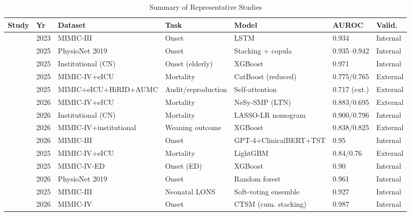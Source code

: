 \documentclass[conference]{IEEEtran}
\begin{document}
\begin{table}[t]
\caption{Summary of Representative Studies}
\label{tab:studies}
\centering
\footnotesize
\begin{tabular}{@{}lllllll@{}}
\toprule
\textbf{Study} & \textbf{Yr} & \textbf{Dataset} & \textbf{Task} & \textbf{Model} & \textbf{AUROC} & \textbf{Valid.} \\
\midrule
\cite{r13} & 2023 & MIMIC-III & Onset & LSTM & 0.934 & Internal \\
\cite{r14} & 2025 & PhysioNet 2019 & Onset & Stacking + copula & 0.935--0.942 & Internal \\
\cite{r15} & 2025 & Institutional (CN) & Onset (elderly) & XGBoost & 0.971 & Internal \\
\cite{r17} & 2025 & MIMIC-IV+eICU & Mortality & CatBoost (reduced) & 0.775/0.765 & External \\
\cite{r18} & 2025 & MIMIC+eICU+HiRID+AUMC & Audit/reproduction & Self-attention & 0.717 (ext.) & External \\
\cite{r19} & 2026 & MIMIC-IV+eICU & Mortality & NeSy-SMP (LTN) & 0.883/0.695 & External \\
\cite{r20} & 2026 & Institutional (CN) & Mortality & LASSO-LR nomogram & 0.900/0.796 & Internal \\
\cite{r21} & 2026 & MIMIC-IV+institutional & Weaning outcome & XGBoost & 0.838/0.825 & External \\
\cite{r22} & 2026 & MIMIC-III & Onset & GPT-4+ClinicalBERT+TST & 0.95 & Internal \\
\cite{r23} & 2025 & MIMIC-IV+eICU & Mortality & LightGBM & 0.84/0.76 & External \\
\cite{r27} & 2025 & MIMIC-IV-ED & Onset (ED) & XGBoost & 0.90 & Internal \\
\cite{r30} & 2026 & PhysioNet 2019 & Onset & Random forest & 0.961 & Internal \\
\cite{r32} & 2025 & MIMIC-III & Neonatal LONS & Soft-voting ensemble & 0.927 & Internal \\
\cite{r33} & 2026 & MIMIC-IV & Onset & CTSM (cum. stacking) & 0.987 & Internal \\
\bottomrule
\end{tabular}
\end{table}
\end{document}
